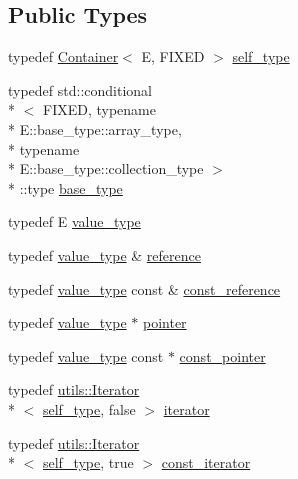 \subsection*{Public Types}
\begin{DoxyCompactItemize}
\item 
typedef \hyperlink{classpanda_1_1Container}{Container}$<$ E, F\-I\-X\-E\-D $>$ \hyperlink{classpanda_1_1Container_a3c67ee697decfd9da487194415cce212}{self\-\_\-type}
\item 
typedef std\-::conditional\\*
$<$ F\-I\-X\-E\-D, typename \\*
E\-::base\-\_\-type\-::array\-\_\-type, \\*
typename \\*
E\-::base\-\_\-type\-::collection\-\_\-type $>$\\*
\-::type \hyperlink{classpanda_1_1Container_a8992944adadcfadc748a10c3806287ac}{base\-\_\-type}
\item 
typedef E \hyperlink{classpanda_1_1Container_ad0e3660560ba84378cccf0f00a03d56f}{value\-\_\-type}
\item 
typedef \hyperlink{classpanda_1_1Container_ad0e3660560ba84378cccf0f00a03d56f}{value\-\_\-type} \& \hyperlink{classpanda_1_1Container_a3b6330ccf0d9ed33975d098520f103cb}{reference}
\item 
typedef \hyperlink{classpanda_1_1Container_ad0e3660560ba84378cccf0f00a03d56f}{value\-\_\-type} const \& \hyperlink{classpanda_1_1Container_a336135bd19b8b176006d8e7413c8c8f1}{const\-\_\-reference}
\item 
typedef \hyperlink{classpanda_1_1Container_ad0e3660560ba84378cccf0f00a03d56f}{value\-\_\-type} $\ast$ \hyperlink{classpanda_1_1Container_ad46ede4b3ab0c2701ba870ace55eb4da}{pointer}
\item 
typedef \hyperlink{classpanda_1_1Container_ad0e3660560ba84378cccf0f00a03d56f}{value\-\_\-type} const $\ast$ \hyperlink{classpanda_1_1Container_a6a208612c0f0c4bddce70a7e9f4b2df3}{const\-\_\-pointer}
\item 
typedef \hyperlink{classpanda_1_1utils_1_1Iterator}{utils\-::\-Iterator}\\*
$<$ \hyperlink{classpanda_1_1Container_a3c67ee697decfd9da487194415cce212}{self\-\_\-type}, false $>$ \hyperlink{classpanda_1_1Container_a6cc72f63b5ff916743cfd82f3d06aace}{iterator}
\item 
typedef \hyperlink{classpanda_1_1utils_1_1Iterator}{utils\-::\-Iterator}\\*
$<$ \hyperlink{classpanda_1_1Container_a3c67ee697decfd9da487194415cce212}{self\-\_\-type}, true $>$ \hyperlink{classpanda_1_1Container_a0f9926d6b9fa94064fdbe119f0da78ed}{const\-\_\-iterator}
\end{DoxyCompactItemize}
